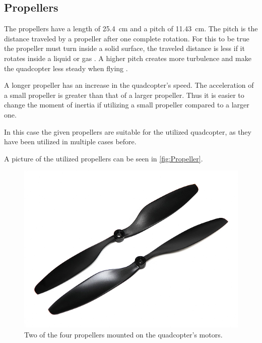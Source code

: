\subsection{Propellers}
The propellers have a length of \SI{25.4}{cm} and a pitch of \SI{11.43}{cm}. The pitch is the distance traveled by a propeller after one complete rotation. For this to be true the propeller must turn inside a solid surface, the traveled distance is less if it rotates inside a liquid or gas \cite{EReyes}. A higher pitch creates more turbulence and make the quadcopter less steady when flying \cite{oscarliang}.

A longer propeller has an increase in the quadcopter's speed. The acceleration of a small propeller is greater than that of a larger propeller. Thus it is easier to change the moment of inertia if utilizing a small propeller compared to a larger one. \cite{oscarliang}

In this case the given propellers are suitable for the utilized quadcopter, as they have been utilized in multiple cases before. 

A picture of the utilized propellers can be seen in \autoref{fig:Propeller}.

\begin{figure}[H]
	\centering
	\includegraphics[scale=0.6]{figures/propellerphoto.png}
	\caption{Two of the four propellers mounted on the quadcopter's motors.\cite{HkingPropeller}}
	\label{fig:Propeller}
\end{figure}


